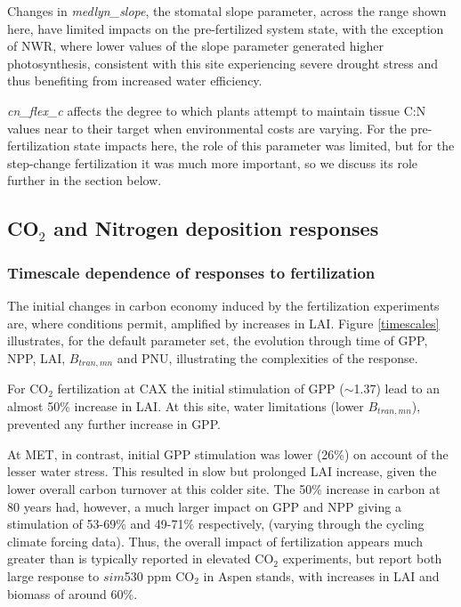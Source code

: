 \usepackage{}\documentclass[draft,linenumbers]{agujournal}
\begin{document}
Changes in \emph{medlyn\_slope}, the stomatal slope parameter, across the range shown here, have limited impacts on the pre-fertilized system state, with the exception of NWR, where lower values of the slope parameter generated higher photosynthesis, consistent with this site experiencing severe drought stress and thus benefiting from increased water efficiency. 

\emph{cn\_flex\_c} affects the degree to which plants attempt to maintain tissue C:N values near to their target when environmental costs are varying. For the pre-fertilization state impacts here, the role of this parameter was limited, but for the step-change fertilization it was much more important, so we discuss its role further in the section below. 

\subsection{CO$_{2}$ and Nitrogen deposition responses}

\subsubsection{Timescale dependence of responses to fertilization}
The initial changes in carbon economy induced by the fertilization experiments are, where conditions permit, amplified by increases in LAI. Figure \ref{timescales} illustrates, for the default parameter set, the evolution through time of GPP, NPP, LAI, $B_{tran,mn}$ and PNU, illustrating the complexities of the response. 

For CO$_{2}$ fertilization at CAX the initial stimulation of GPP ($\sim$1.37) lead to an almost 50\% increase in LAI. At this site, water limitations (lower $B_{tran,mn}$), prevented any further increase in GPP. 

 At MET, in contrast, initial GPP stimulation was lower (26\%) on account of the lesser water stress. This resulted in slow but prolonged LAI increase, given the lower overall carbon turnover at this colder site. The 50\% increase in carbon at 80 years had, however, a much larger impact on GPP and NPP giving a stimulation of 53-69\% and 49-71\% respectively, (varying through the cycling climate forcing data). Thus, the overall impact of fertilization appears much greater than is typically reported in elevated CO$_{2}$ experiments, but \cite{king2005} report both large response to $sim$530 ppm CO$_{2}$ in Aspen stands, with increases in LAI and biomass of around 60\%.
 
\end{document}
